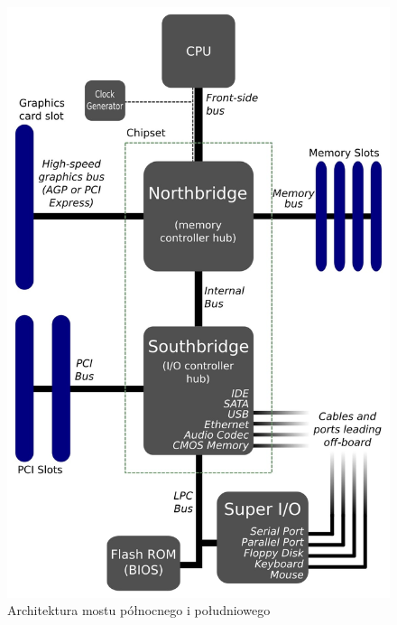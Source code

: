 \documentclass[shortabstract,inz]{iithesis}
\begin{document}


\begin{figure}
  \begin{center}
    \includegraphics[width=\linewidth/2]{south_north_bridge}
  \caption{Architektura mostu północnego i południowego \cite{image:south_north_bridges}}
\end{center}
\end{figure}
\end{document}
